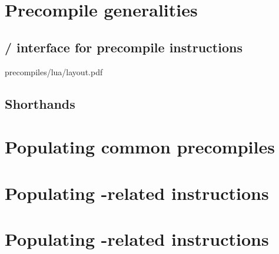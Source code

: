 \section{Precompile generalities}                                          \label{oob: populating: precompiles}
\subsection{\hubMod{} / \oobMod{} interface for precompile instructions}   \label{oob: hub / oob interface for precompiles}   {precompiles/lua/layout.pdf}
\subsection{Shorthands}                                                    \label{oob: populating: shorthands}                                               
\section{Populating common precompiles}                                    \label{oob: populating: common precompiles}                                   
\section{Populating -related \oobMod{} instructions}          \label{oob: populating: modexp}                                               
\section{Populating -related \oobMod{} instructions}         \label{oob: populating: blake2f}                  
